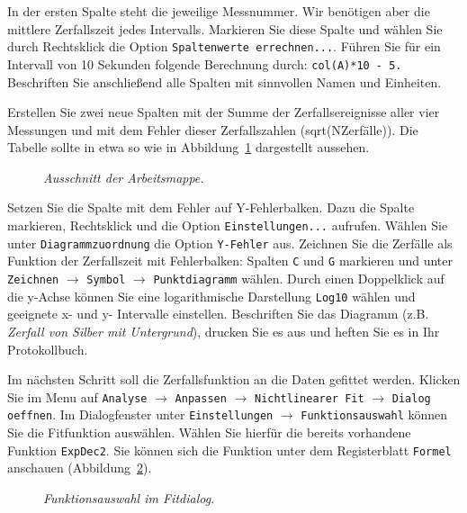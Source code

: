 \documentclass[landscape,twocolumn]{article}
\begin{document}
\begin{enumerate}
In der ersten Spalte steht die jeweilige Messnummer. Wir ben\"{o}tigen aber die mittlere Zerfallszeit jedes Intervalls. Markieren Sie diese Spalte und w\"{a}hlen Sie durch Rechtsklick die Option  \verb"Spaltenwerte errechnen...". F\"{u}hren Sie f\"{u}r ein Intervall von 10 Sekunden folgende Berechnung durch:  \verb"col(A)*10 - 5." Beschriften Sie anschlie{\ss}end alle Spalten mit sinnvollen Namen und Einheiten.

Erstellen Sie zwei neue Spalten mit der Summe der Zerfallsereignisse aller vier Messungen und mit dem Fehler dieser Zerfallszahlen (sqrt(NZerf\"{a}lle)). Die Tabelle sollte in etwa so wie in Abbildung~\ref{252_soft1} dargestellt aussehen.

\begin{figure}[h]
\begin{minipage}[c]{12cm}
\centering{}
\caption{\fontsize{10}{12}\it \label{252_soft1} Ausschnitt der Arbeitsmappe.}
\end{minipage}
\end{figure}

Setzen Sie die Spalte mit dem Fehler auf Y-Fehlerbalken. Dazu die Spalte markieren, Rechtsklick und die Option \verb"Einstellungen..." aufrufen. W\"{a}hlen Sie unter \verb"Diagrammzuordnung" die Option \verb"Y-Fehler" aus. Zeichnen Sie die Zerf\"{a}lle als Funktion der Zerfallszeit mit Fehlerbalken: Spalten \verb"C" und \verb"G" markieren und unter \verb"Zeichnen" $\rightarrow$ \verb"Symbol" $\rightarrow$ \verb"Punktdiagramm" w\"{a}hlen. Durch einen Doppelklick auf die y-Achse k\"{o}nnen Sie eine logarithmische Darstellung \verb"Log10" w\"{a}hlen und geeignete x- und y- Intervalle einstellen. Beschriften Sie das Diagramm (z.B. \textit{Zerfall von Silber mit Untergrund}), drucken Sie es aus und heften Sie es in Ihr Protokollbuch.

Im n\"{a}chsten Schritt soll die Zerfallsfunktion an die Daten gefittet werden.
Klicken Sie im Menu auf \verb"Analyse" $\rightarrow$ \verb"Anpassen" $\rightarrow$ \verb"Nichtlinearer Fit" $\rightarrow$ \verb"Dialog oeffnen".
Im Dialogfenster unter \verb"Einstellungen" $\rightarrow$ \verb"Funktionsauswahl" k\"{o}nnen Sie die Fitfunktion ausw\"{a}hlen. W\"{a}hlen Sie hierf\"{u}r die bereits vorhandene Funktion \verb"ExpDec2". Sie k\"{o}nnen sich die Funktion unter dem Registerblatt  \verb"Formel" anschauen (Abbildung~\ref{252_soft2}).

\begin{figure}[h]
\begin{minipage}[c]{12cm}
\centering{}
\caption{\fontsize{10}{12}\it \label{252_soft2} Funktionsauswahl im Fitdialog.}
\end{minipage}
\end{figure}


\end{enumerate}
\end{document}
